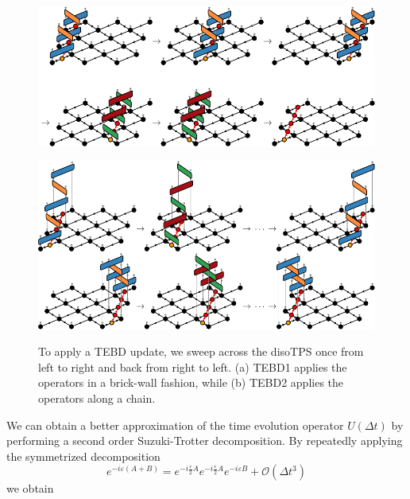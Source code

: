 \begin{figure}
	\centering
	\subcaptionbox{\label{fig:disoTPS_TEBD_global_update_applying_TEBD1}}
	{%
		\includegraphics[scale=1]{figures/tikz/disoTPS/tebd_global_update_steps/tebd_global_update_steps_a.pdf}
	}
	\par\bigskip\medskip
	\subcaptionbox{\label{fig:disoTPS_TEBD_global_update_applying_TEBD2}}
	{%
		\includegraphics[scale=1]{figures/tikz/disoTPS/tebd_global_update_steps/tebd_global_update_steps_b.pdf}
	}
	\caption{To apply a TEBD update, we sweep across the disoTPS once from left to right and back from right to left. (a) TEBD1 applies the operators in a brick-wall fashion, while (b) TEBD2 applies the operators along a chain.}
	\label{fig:disoTPS_TEBD_global_update_applying_TEBD}
\end{figure}
We can obtain a better approximation of the time evolution operator $U(\Delta t)$ by performing a second order Suzuki-Trotter decomposition. By repeatedly applying the symmetrized decomposition
\begin{equation}
	e^{-i\varepsilon(A+B)} = e^{-i\frac{\varepsilon}{2}A}e^{-i\frac{\varepsilon}{2}A}e^{-i\varepsilon B} + \mathcal{O}(\Delta t^3)
\end{equation}
we obtain

